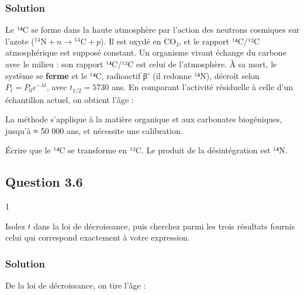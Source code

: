 \documentclass[11pt,a4paper]{article}
\newcommand{\equationajustee}[1]{%
  \sbox{\boiteequation}{$\displaystyle #1$}%
  \ifdim\wd\boiteequation>\linewidth
    \[\resizebox{\linewidth}{!}{\usebox{\boiteequation}}\]%
  \else
    \[#1\]%
  \fi}
\begin{document}
\hypertarget{solution-32}{%
\subsubsection{Solution}\label{solution-32}}

Le ¹⁴C se forme dans la haute atmosphère par l'action des neutrons cosmiques sur l'azote (\(^{14}\mathrm{N}+n\rightarrow{}^{14}\mathrm{C}+p\)). Il est oxydé en CO₂, et le rapport ¹⁴C/¹²C atmosphérique est supposé constant. Un organisme vivant échange du carbone avec le milieu : son rapport ¹⁴C/¹²C est celui de l'atmosphère. À sa mort, le système se \textbf{ferme} et le ¹⁴C, radioactif β⁻ (il redonne ¹⁴N), décroît selon \(P_t = P_0e^{-\lambda t}\), avec \(t_{1/2} = 5730\) ans. En comparant l'activité résiduelle à celle d'un échantillon actuel, on obtient l'âge :

\equationajustee{t = -\frac{1}{\lambda}\ln\frac{P_t}{P_0}}

La méthode s'applique à la matière organique et aux carbonates biogéniques, jusqu'à ≈ 50 000 ans, et nécessite une calibration.

\begin{piege}

Écrire que le ¹⁴C se transforme en ¹²C. Le produit de la désintégration est ¹⁴N.

\end{piege}

\hypertarget{question-3.6}{%
\subsection{Question 3.6}\label{question-3.6}}

\begin{indication}{1}

Isolez \(t\) dans la loi de décroissance, puis cherchez parmi les trois résultats fournis celui qui correspond exactement à votre expression.

\end{indication}

\hypertarget{solution-33}{%
\subsubsection{Solution}\label{solution-33}}

De la loi de décroissance, on tire l'âge :

\equationajustee{\begin{aligned}
\frac{P_t}{P_0} &= e^{-\lambda t} \\
t &= \frac{-\ln(P_t/P_0)}{\lambda}
\end{aligned}}
\end{document}
